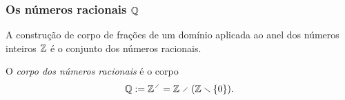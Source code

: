 \begin{comment}
(Homomorfismo de monoide) Sejam $\frac{n}{d},\frac{n'}{d'} \in Q(D)$. Então
	\begin{align*}
	\bar h\left( \frac{n}{d}\frac{n'}{d'} \right) &= \bar h\left( \frac{nn'}{dd'} \right) \\
		&= h(nn')h(dd')\inv \\
		&= h(n)h(n')h(d)\inv h(d')\inv \\
		&= h(n)h(d)\inv h(n')h(d')\inv \\
		&= \bar h\left( \frac{n}{d} \right)\bar h \left( \frac{n'}{d'} \right).
	\end{align*}
Ainda, como $h$ é homomorfismo de anel, $h(1)=1$, logo
	\begin{equation*}
	\bar h\left( \frac{1}{1} \right) = h(1)h(1)\inv = 1.
	\end{equation*}

(Injetividade) Sejam $\frac{n}{d},\frac{n'}{d'} \in Q(D)$ tais que $\bar h(\frac{n}{d}) = \bar h(\frac{n'}{d'})$. Então
	\begin{align*}
	0 &= \bar h \left( \frac{n}{d} \right) - \bar h \left( \frac{n'}{d'} \right) \\
		&= \bar h \left( \frac{n}{d} - \frac{n'}{d'} \right) \\
		&= \bar h \left( \frac{nd'-dn'}{dd'} \right) \\
		&= h(nd'-dn')h(dd')\inv.
	\end{align*}
Como $d \neq 0$ e $d' \neq 0$, segue que $h(nd'-dn')=0$, e da injetividade de $h$ segue que $nd'-dn'=0$, logo $nd'=dn'$, o que significa que $\frac{n}{d} = \frac{n'}{d'}$.

\end{proof}


\end{comment}


\subsubsection{Os números racionais \texorpdfstring{$\mathbb{Q}$}{}}

A construção de corpo de frações de um domínio aplicada ao anel dos números inteiros $\mathbb{Z}$ é o conjunto dos números racionais.

\begin{definition}
O \emph{corpo dos números racionais} é o corpo
	\begin{equation*}
	\Q := \Z^{\olddiv} = \Z \olddiv (\Z \setminus \{0\}).
	\end{equation*}
\end{definition}




